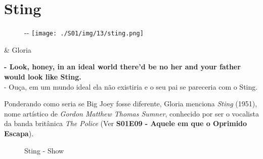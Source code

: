 \hypertarget{sting}{%
\section{Sting}\label{sting}}

\begin{figure}[!ht]
  \begin{adjustwidth}{-\oddsidemargin-1in}{-\rightmargin}
    \centering
    \texttt{[image: ./S01/img/13/sting.png]}
  \end{adjustwidth}
\end{figure}

\begin{tcolorbox}[enhanced,center upper,
    drop fuzzy shadow southeast, boxrule=0.3pt,
    lower separated=false, breakable,
    colframe=black!30!dialogoBorder,colback=white]
\begin{minipage}[c]{0.16\linewidth}
   & \centering \scriptsize{Gloria}
\end{minipage}
\hfill
\begin{minipage}[c]{0.8\linewidth}
  \textbf{- Look, honey, in an ideal world there'd be no her and your father would look like Sting.}\\
  - Ouça, em um mundo ideal ela não existiria e o seu pai se pareceria com o Sting.
\end{minipage}
\end{tcolorbox}

Ponderando como seria se Big Joey fosse diferente, Gloria menciona
\emph{Sting} (1951), nome artístico de \emph{Gordon Matthew Thomas
Sumner}, conhecido por ser o vocalista da banda britânica \emph{The
Police} (Ver
\textbf{\textcolor{primarycolor}{S01E09 - Aquele em que o Oprimido Escapa}}).

\begin{figure}
  \centering
    \caption{Sting - Show\label{fig:sting-show}}
\end{figure}

